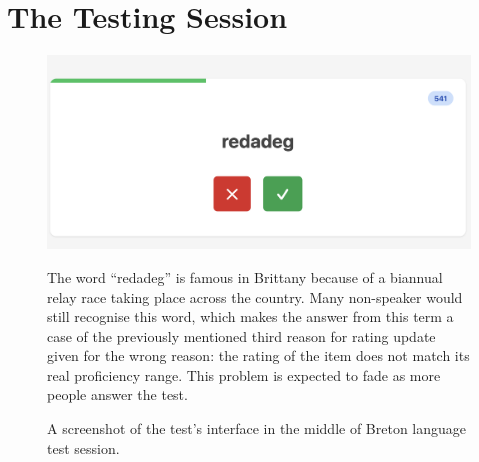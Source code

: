 \section{The Testing Session}
    \begin{figure}
        \centering
        \includegraphics[width=0.5\linewidth]{figures/screenshot-redadeg.png}
        \caption{A screenshot of the test's interface in the middle of Breton language test session.}
        \medskip
        \small
        The word ``redadeg'' is famous in Brittany because of a biannual relay race taking place across the country. Many non-speaker would still recognise this word, which makes the answer from this term a case of the previously mentioned third reason for rating update given for the wrong reason: the rating of the item does not match its real proficiency range. This problem is expected to fade as more people answer the test.
        
    \end{figure}\label{fig:screenshot}

